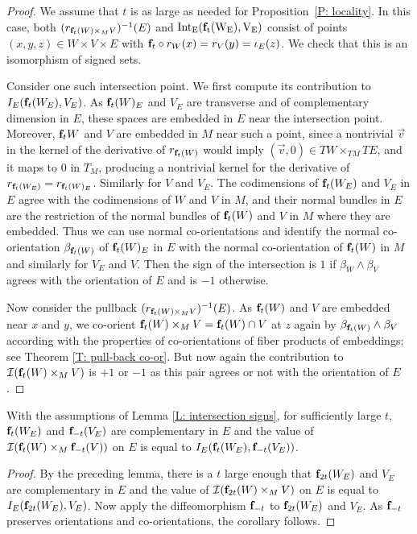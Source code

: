 \begin{proof}
	We assume that $t$ is as large as needed for Proposition~\ref{P: locality}.
	In this case, both $(r_{\mathbf{f}_t(W) \times_M V})^{-1}(E)$ and $\rm{Int}_E(\mathbf{f}_t(W_E), V_E)$ consist of points $(x,y,z)\in W \times V \times E$ with $\mathbf{f}_t \circ r_W (x)= r_V (y)= \iota_E(z)$. 
	We check that this is an isomorphism of signed sets.
		
	Consider one such intersection point. We first compute its contribution to $I_E(\mathbf{f}_t(W_E), V_E)$. As $\mathbf{f}_t(W)_E$ and $V_E$ are transverse and of complementary dimension in $E$, these spaces are embedded in $E$ near the intersection point.
	Moreover, $\mathbf{f}_t W$ and $V$ are embedded in $M$ near such a point, since a nontrivial $\vec v$ in the kernel of the derivative of $r_{\mathbf{f}_t (W)}$ would imply $(\vec v,0)\in TW\times_{TM} TE$, and it maps to $0$ in $T_M$, producing a nontrivial kernel for the derivative of $r_{\mathbf{f}_t(W_E)}=r_{\mathbf{f}_t(W)_E}$. Similarly for $V$ and $V_E$.
	The codimensions of $\mathbf{f}_t (W_E)$ and $V_E$ in $E$ agree with the codimensions of $W$ and $V$ in $M$, and their normal bundles in $E$ are the restriction of the normal bundles of $\mathbf{f}_t(W)$ and $V$ in $M$ where they are embedded.
	Thus we can use normal co-orientations and identify the normal co-orientation $\beta_{\mathbf{f}_t(W)}$ of $\mathbf{f}_t(W)_E$ in $E$ with the normal co-orientation of $\mathbf{f}_t(W)$ in $M$ and similarly for $V_E$ and $V$.
	Then the sign of the intersection is $1$ if $\beta_W \wedge \beta_V$ agrees with the orientation of $E$ and is $-1$ otherwise.
	 
	Now consider the pullback $(r_{\mathbf{f}_t(W) \times_M V})^{-1}(E)$. 
	As $\mathbf{f}_t( W)$ and $V$ are embedded near $x$ and $y$, we co-orient $\mathbf{f}_t(W) \times_M V = \mathbf{f}_t(W)\cap V$ at $z$ again by $\beta_{\mathbf{f}_t(W)} \wedge \beta_V$ according with the properties of co-orientations of fiber products of embeddings; see Theorem \ref{T: pull-back co-or}.
	But now again the contribution to $\mathcal{I}(\mathbf{f}_t(W) \times_M V)$ is $+1$ or $-1$ as this pair agrees or not with the orientation of $E$.
\end{proof}

\begin{corollary} \label{C: intersection signs}
	With the assumptions of Lemma \ref{L: intersection signs}, for sufficiently large $t$, $\mathbf{f}_t(W_E)$ and $\mathbf{f}_{-t}(V_E)$ are complementary in $E$ and the value of $\mathcal{I}(\mathbf{f}_t(W) \times_M \mathbf{f}_{-t}(V))$ on $E$ is equal to $I_E(\mathbf{f}_t(W_E), \mathbf{f}_{-t}(V_E))$.
\end{corollary}

\begin{proof}
	By the preceding lemma, there is a $t$ large enough that $\mathbf{f}_{2t}(W_E)$ and $V_E$ are complementary in $E$ and the value of $\mathcal{I}(\mathbf{f}_{2t}(W) \times_M V)$ on $E$ is equal to $I_E(\mathbf{f}_{2t}(W_E), V_E)$.
	Now apply the diffeomorphism $\mathbf{f}_{-t}$ to $\mathbf{f}_{2t}(W_E)$ and $V_E$.
	As $\mathbf{f}_{-t}$ preserves orientations and co-orientations, the corollary follows.
\end{proof}


